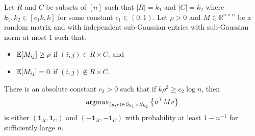 \begin{lemma} \label{lem:rossearch}
Let $R$ and $C$ be subsets of $[n]$ such that $|R| = k_1$ and $|C| = k_2$ where $k_1, k_2 \in [c_1 k, k]$ for some constant $c_1 \in (0, 1)$. Let $\rho > 0$ and $M \in \mathbb{R}^{n \times n}$ be a random matrix and with independent sub-Gaussian entries with sub-Gaussian norm at most $1$ such that:
\begin{itemize}
\item $\mathbb{E}[M_{ij}] \ge \rho$ if $(i, j) \in R \times C$; and
\item $\mathbb{E}[M_{ij}] = 0$ if $(i, j) \not \in R \times C$.
\end{itemize}
There is an absolute constant $c_2 > 0$ such that if $k\rho^2 \ge c_2 \log n$, then
$$\textnormal{argmax}_{(u, v) \in S_{k_1} \times S_{k_2}} \left\{ u^\top M v \right\}$$
is either $(\mathbf{1}_R, \mathbf{1}_C)$ and $(-\mathbf{1}_R, -\mathbf{1}_C)$ with probability at least $1 - n^{-1}$ for sufficiently large $n$.
\end{lemma}

